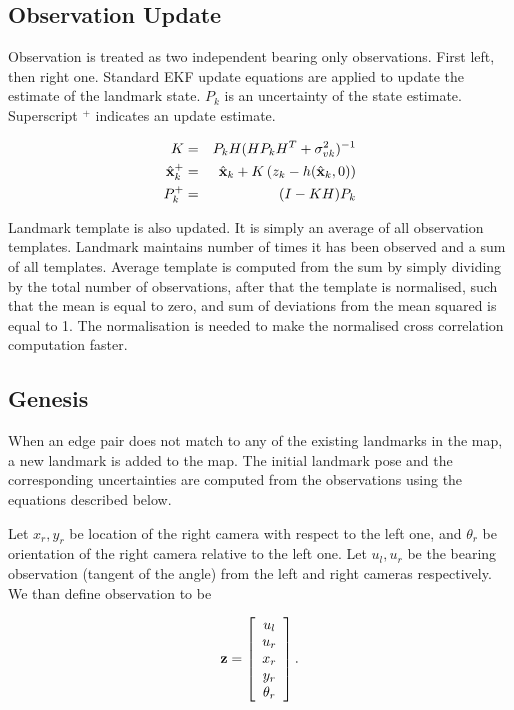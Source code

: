 \subsection{Observation Update}

Observation is treated as two independent bearing only
observations. First left, then right one. Standard EKF update
equations are applied to update the estimate of the landmark
state. $P_k$ is an uncertainty of the state estimate.  Superscript
$^+$ indicates an update estimate.

\begin{eqnarray}
K &=& P_kH(HP_kH^T + \sigma^2_{vk})^{-1}\\
\hat{\bf x}^+_k &=& \hat{\bf x}_k + 
                      K\left(z_k - h(\hat{\bf x}_k,0) \right)\\
P^+_k &=& (I - KH)P_k
\end{eqnarray}


Landmark template is also updated. It is simply an average of all
observation templates. Landmark maintains number of times it has been
observed and a sum of all templates. Average template is computed from
the sum by simply dividing by the total number of observations, after
that the template is normalised, such that the mean is equal to zero,
and sum of deviations from the mean squared is equal to 1. The
normalisation is needed to make the normalised cross correlation
computation faster.



\subsection{Genesis}

When an edge pair does not match to any of the existing landmarks in
the map, a new landmark is added to the map. The initial landmark pose
and the corresponding uncertainties are computed from the observations
using the equations described below.

Let $x_r,y_r$ be location of the right camera with respect to the left
one, and $\theta_r$ be orientation of the right camera relative to the
left one. Let $u_l,u_r$ be the bearing observation (tangent of the
angle) from the left and right cameras respectively. We than define
observation to be

$$
{\bf z} =  \left[
    \begin{array}{c}
       u_l\\u_r\\x_r\\y_r\\\theta_r
    \end{array}
\right].
$$

